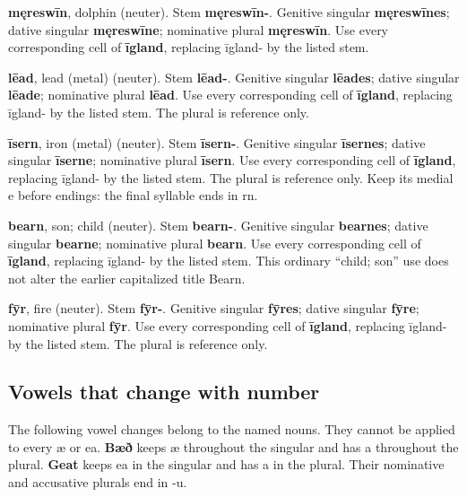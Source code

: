 \textbf{męreswīn}, dolphin (neuter). Stem \textbf{męreswīn-}. Genitive singular \textbf{męreswīnes}; dative singular \textbf{męreswīne}; nominative plural \textbf{męreswīn}. Use every corresponding cell of \textbf{īgland}, replacing īgland- by the listed stem.

\textbf{lēad}, lead (metal) (neuter). Stem \textbf{lēad-}. Genitive singular \textbf{lēades}; dative singular \textbf{lēade}; nominative plural \textbf{lēad}. Use every corresponding cell of \textbf{īgland}, replacing īgland- by the listed stem. The plural is reference only.

\textbf{īsern}, iron (metal) (neuter). Stem \textbf{īsern-}. Genitive singular \textbf{īsernes}; dative singular \textbf{īserne}; nominative plural \textbf{īsern}. Use every corresponding cell of \textbf{īgland}, replacing īgland- by the listed stem. The plural is reference only. Keep its medial e before endings: the final syllable ends in rn.

\textbf{bearn}, son; child (neuter). Stem \textbf{bearn-}. Genitive singular \textbf{bearnes}; dative singular \textbf{bearne}; nominative plural \textbf{bearn}. Use every corresponding cell of \textbf{īgland}, replacing īgland- by the listed stem. This ordinary “child; son” use does not alter the earlier capitalized title Bearn.

\textbf{fȳr}, fire (neuter). Stem \textbf{fȳr-}. Genitive singular \textbf{fȳres}; dative singular \textbf{fȳre}; nominative plural \textbf{fȳr}. Use every corresponding cell of \textbf{īgland}, replacing īgland- by the listed stem. The plural is reference only.

\subsection*{Vowels that change with number}

The following vowel changes belong to the named nouns. They cannot be applied to every æ or ea. \textbf{Bæð} keeps æ throughout the singular and has a throughout the plural. \textbf{Geat} keeps ea in the singular and has a in the plural. Their nominative and accusative plurals end in -u.

